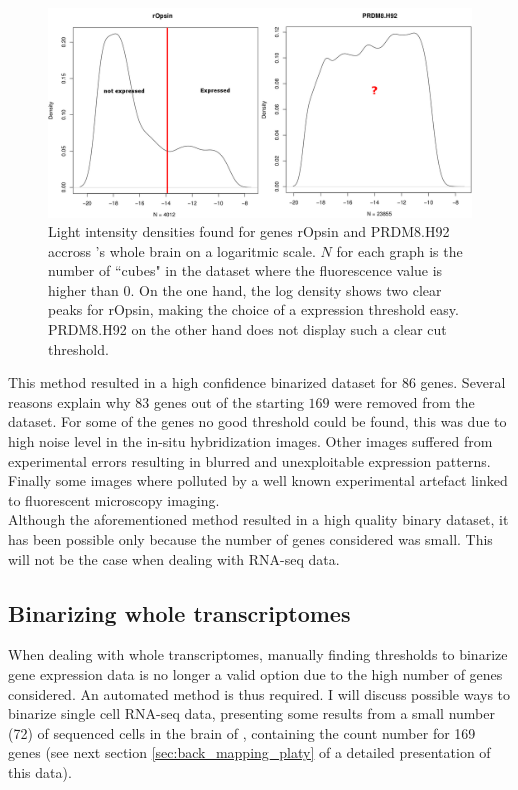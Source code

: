 	\begin{figure}[h]
\centerline{\includegraphics[width=\linewidth]{gfx/chapter2/densities_bina.png}}
\caption{Light intensity densities found for genes rOpsin and PRDM8.H92 accross \platy{}'s whole brain on a logaritmic scale. $N$ for each graph is the number of ``cubes" in the dataset where the fluorescence value is higher than $0$. On the one hand, the log density shows two clear peaks for rOpsin, making the choice of a expression threshold easy. PRDM8.H92 on the other hand does not display such a clear cut threshold.}\label{fig:densities_bina}
	\end{figure}
	
	This method resulted in a high confidence binarized dataset for $86$ genes. Several reasons explain why $83$ genes out of the starting $169$ were removed from the dataset. For some of the genes no good threshold could be found, this was due to high noise level in the in-situ hybridization images. Other images suffered from experimental errors resulting in blurred and unexploitable expression patterns. Finally some images where polluted by a well known experimental artefact linked to fluorescent microscopy imaging.\\
	
	Although the aforementioned method resulted in a high quality binary dataset, it has been possible only because the number of genes considered was small. This will not be the case when dealing with RNA-seq data.

  \subsection{Binarizing whole transcriptomes}
  
  When dealing with whole transcriptomes, manually finding thresholds to binarize gene expression data is no longer a valid option due to the high number of genes considered. An automated method is thus required. I will discuss possible ways to binarize single cell RNA-seq data, presenting some results from a small number (72) of sequenced cells in the brain of \platy{}, containing the count number for 169 genes (see next section \ref{sec:back_mapping_platy} of a detailed presentation of this data).\\
  
